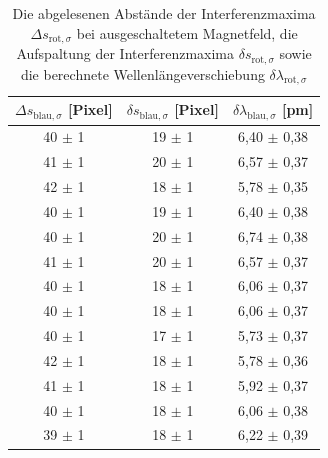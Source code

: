               \begin{table}[h]
                \centering
                \caption{Die abgelesenen Abstände der Interferenzmaxima $\Delta s_{\text{rot}, \sigma}$ bei ausgeschaltetem Magnetfeld, die Aufspaltung der Interferenzmaxima $\delta s_{\text{rot}, \sigma}$ sowie die berechnete Wellenlängeverschiebung $\delta \lambda_{\text{rot}, \sigma}$}
                \label{tab:blau_pi}
              
                \begin{tabular}{c c c}
                  \toprule
                  {$\Delta s_{\text{blau}, \sigma}$ [Pixel]} & {$\delta s_{\text{blau}, \sigma}$ [Pixel]} & {$\delta \lambda_{\text{blau}, \sigma}$ [\si{\pico\metre}]} \\ 
                  \midrule
                   40 $\pm$ 1  &   19 $\pm$ 1   &   6,40 $\pm$ 0,38   \\
                   41 $\pm$ 1  &   20 $\pm$ 1   &   6,57 $\pm$ 0,37   \\
                   42 $\pm$ 1  &   18 $\pm$ 1   &   5,78 $\pm$ 0,35   \\
                   40 $\pm$ 1  &   19 $\pm$ 1   &   6,40 $\pm$ 0,38   \\
                   40 $\pm$ 1  &   20 $\pm$ 1   &   6,74 $\pm$ 0,38   \\
                   41 $\pm$ 1  &   20 $\pm$ 1   &   6,57 $\pm$ 0,37   \\
                   40 $\pm$ 1  &   18 $\pm$ 1   &   6,06 $\pm$ 0,37   \\
                   40 $\pm$ 1  &   18 $\pm$ 1   &   6,06 $\pm$ 0,37   \\
                   40 $\pm$ 1  &   17 $\pm$ 1   &   5,73 $\pm$ 0,37   \\
                   42 $\pm$ 1  &   18 $\pm$ 1   &   5,78 $\pm$ 0,36   \\
                   41 $\pm$ 1  &   18 $\pm$ 1   &   5,92 $\pm$ 0,37   \\
                   40 $\pm$ 1  &   18 $\pm$ 1   &   6,06 $\pm$ 0,38   \\
                   39 $\pm$ 1  &   18 $\pm$ 1   &   6,22 $\pm$ 0,39   \\

                  \bottomrule
                \end{tabular}
              \end{table}
              \FloatBarrier
            
            